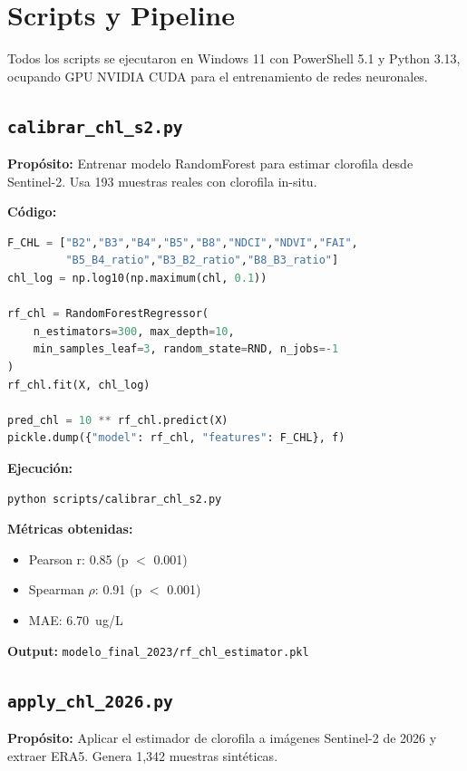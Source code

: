 \documentclass[12pt]{article}
\begin{document}
\section{Scripts y Pipeline}

Todos los scripts se ejecutaron en Windows 11 con PowerShell 5.1 y Python 3.13, ocupando GPU NVIDIA CUDA para el entrenamiento de redes neuronales.

\subsection{\texttt{calibrar\_chl\_s2.py}}
\textbf{Prop\'osito:} Entrenar modelo RandomForest para estimar clorofila desde Sentinel-2. Usa 193 muestras reales con clorofila in-situ.

\textbf{C\'odigo:}
\begin{lstlisting}[language=Python]
F_CHL = ["B2","B3","B4","B5","B8","NDCI","NDVI","FAI",
         "B5_B4_ratio","B3_B2_ratio","B8_B3_ratio"]
chl_log = np.log10(np.maximum(chl, 0.1))

rf_chl = RandomForestRegressor(
    n_estimators=300, max_depth=10,
    min_samples_leaf=3, random_state=RND, n_jobs=-1
)
rf_chl.fit(X, chl_log)

pred_chl = 10 ** rf_chl.predict(X)
pickle.dump({"model": rf_chl, "features": F_CHL}, f)
\end{lstlisting}

\textbf{Ejecuci\'on:}
\begin{lstlisting}
python scripts/calibrar_chl_s2.py
\end{lstlisting}

\textbf{M\'etricas obtenidas:}
\begin{itemize}
  \item Pearson r: 0.85 (p $<$ 0.001)
  \item Spearman $\rho$: 0.91 (p $<$ 0.001)
  \item MAE: 6.70~ug/L
\end{itemize}
\textbf{Output:} \texttt{modelo\_final\_2023/rf\_chl\_estimator.pkl}

\subsection{\texttt{apply\_chl\_2026.py}}
\textbf{Prop\'osito:} Aplicar el estimador de clorofila a im\'agenes Sentinel-2 de 2026 y extraer ERA5. Genera 1,342 muestras sint\'eticas.
\end{document}
